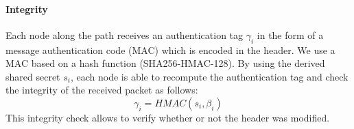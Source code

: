 \paragraph{Integrity}
Each node along the path receives an authentication tag $\gamma_i$ in the form of a message authentication code (MAC)
which is encoded in the header. We use a MAC based on a hash function (SHA256-HMAC-128). By using the derived shared secret $s_i$, each node is able to recompute the authentication tag and check the integrity of the received packet as follows: $$\gamma_i=HMAC(s_i,\beta_i)$$
This integrity check allows to verify whether or not the header was modified.










